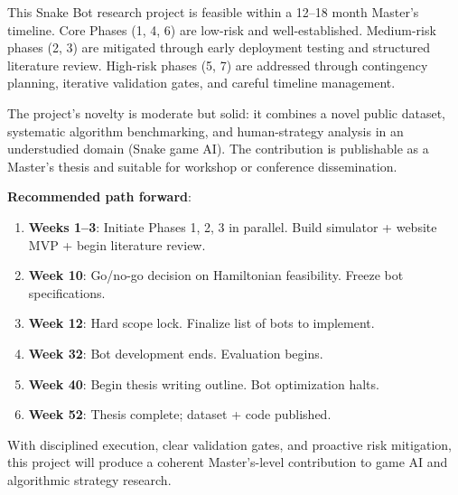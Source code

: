 \documentclass[11pt,a4paper]{article}
\begin{document}
This Snake Bot research project is feasible within a 12--18 month Master's timeline. Core Phases (1, 4, 6) are low-risk and well-established. Medium-risk phases (2, 3) are mitigated through early deployment testing and structured literature review. High-risk phases (5, 7) are addressed through contingency planning, iterative validation gates, and careful timeline management.

The project's novelty is moderate but solid: it combines a novel public dataset, systematic algorithm benchmarking, and human-strategy analysis in an understudied domain (Snake game AI). The contribution is publishable as a Master's thesis and suitable for workshop or conference dissemination.

\textbf{Recommended path forward}:
\begin{enumerate}
    \item \textbf{Weeks 1--3}: Initiate Phases 1, 2, 3 in parallel. Build simulator + website MVP + begin literature review.
    \item \textbf{Week 10}: Go/no-go decision on Hamiltonian feasibility. Freeze bot specifications.
    \item \textbf{Week 12}: Hard scope lock. Finalize list of bots to implement.
    \item \textbf{Week 32}: Bot development ends. Evaluation begins.
    \item \textbf{Week 40}: Begin thesis writing outline. Bot optimization halts.
    \item \textbf{Week 52}: Thesis complete; dataset + code published.
\end{enumerate}

With disciplined execution, clear validation gates, and proactive risk mitigation, this project will produce a coherent Master's-level contribution to game AI and algorithmic strategy research.
\end{document}
